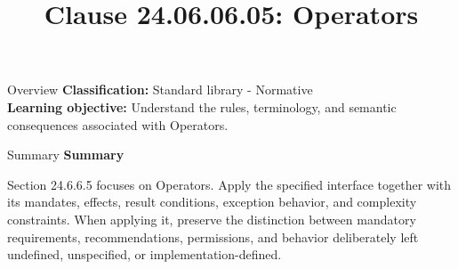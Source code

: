\documentclass[10pt,letterpaper]{article}
\title{Clause 24.06.06.05: Operators}
\author{}
\date{}
\begin{document}
\maketitle
\begin{CornellOverviewBox}{Overview}
\textbf{Classification:} Standard library - Normative\\[2pt]
\textbf{Learning objective:} Understand the rules, terminology, and semantic consequences associated with Operators.
\end{CornellOverviewBox}\begin{CornellSummaryBox}{Summary}
{\sffamily\bfseries\color{Accent} Summary}\par\vspace{3pt}Section 24.6.6.5 focuses on Operators. Apply the specified interface together with its mandates, effects, result conditions, exception behavior, and complexity constraints. When applying it, preserve the distinction between mandatory requirements, recommendations, permissions, and behavior deliberately left undefined, unspecified, or implementation-defined.
\end{CornellSummaryBox}
\end{document}
